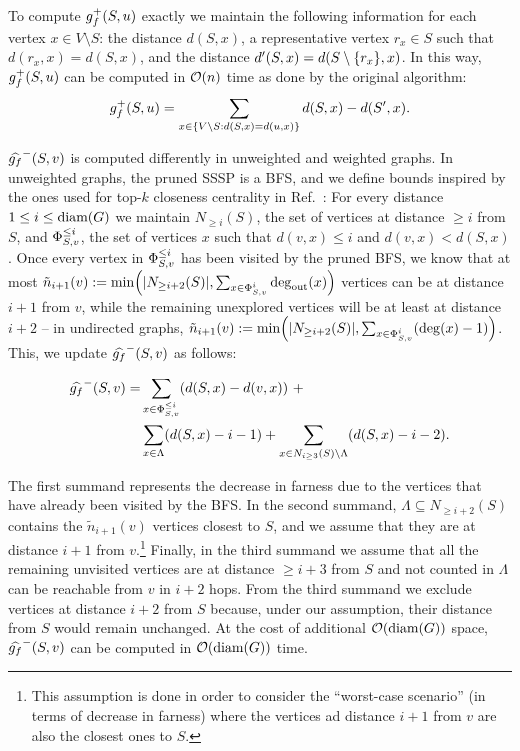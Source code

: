 To compute $g_f^+(S, u)$ exactly we maintain the following information
for each vertex $x \in V \setminus S$: the distance $d(S, x)$,
a representative vertex $r_x \in S$ such that $d(r_x, x) = d(S, x)$,
and the distance $d'(S, x) = d(S \setminus \set{r_x}, x)$. In this way,
$g_f^+(S, u)$ can be computed in $\mathcal{O}(n)$ time as done by the original
\growshrink algorithm:
%
\[
\gfarn^+(S, u) = \sum_{x \in \set{V \setminus S : d(S, x) = d(u, x)}}d(S, x) - d(S', x).
\]

$\widehat{g_f}^-(S, v)$ is computed differently in unweighted and weighted graphs.
In unweighted graphs, the pruned SSSP is a BFS, and we define bounds inspired by
the ones used for top-$k$ closeness centrality in Ref.~\cite{DBLP:journals/tkdd/BergaminiBCMM19}:
For every distance $1 \le i \le \text{diam}(G)$ we maintain $N_{\ge i}(S)$, \ie the set
of vertices at distance $\ge i$ from $S$, and $\Phi_{S, v}^{\le i}$, \ie the set of vertices
$x$ such that $d(v, x) \le i$ and $d(v, x) < d(S, x)$.
%
Once every vertex in $\Phi_{S, v}^{\le i}$ has been visited by the pruned BFS, we know
that at most $\tilde{n}_{i + 1}(v) := \min\roundb{|N_{\ge i + 2}(S)|,
\sum_{x\in \PhiSv^i}\degout(x)}$ vertices can be at distance $i + 1$ from $v$,
while the remaining unexplored vertices will
be at least at distance $i + 2$ -- in undirected graphs,
$\tilde{n}_{i + 1}(v) := \min\roundb{|N_{\ge i + 2}(S)|, \sum_{x \in \PhiSv^i}(\deg(x) - 1)}$.
This, we update $\widehat{g_f}^-(S,  v)$ as follows:

\begin{align*}
\gfarnupp^-(S, v) =& \sum_{x \in \PhiSv^{\le i}}\roundb{d(S, x) - d(v, x)}\ +\\
                &\sum_{x \in \Lambda}(d(S, x) - i - 1) +
\sum_{x \in N_{i \ge 3}(S)\setminus\Lambda}\roundb{d(S, x) - i - 2}.
\end{align*}

The first summand represents the decrease in farness due to the vertices that have already
been visited by the BFS. In the second summand, $\Lambda \subseteq N_{\ge i + 2}(S)$ contains
the $\tilde{n}_{i + 1}(v)$ vertices closest to $S$, and we assume that they are at distance
$i + 1$ from $v$.\footnote{This assumption is done in order to consider
the \enquote{worst-case scenario} (in terms of decrease in farness) where
the vertices ad distance $i + 1$ from $v$ are also the closest ones to $S$.}
Finally, in the third summand we assume that all the remaining unvisited vertices are
at distance $\ge i + 3$ from $S$ and not counted in $\Lambda$ can be reachable from $v$
in $i + 2$ hops. From the third summand we exclude vertices at distance $i + 2$
from $S$ because, under our assumption, their distance from $S$ would remain
unchanged.
At the cost of additional $\mathcal{O}(\text{diam}(G))$ space, $\widehat{g_f}^-(S, v)$ can be computed
in $\mathcal{O}(\text{diam}(G))$ time.


